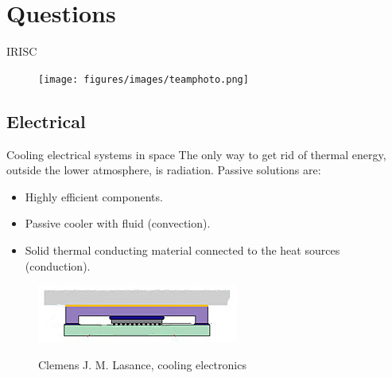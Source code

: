 \documentclass[11pt, aspectratio=169]{beamer}
\begin{document}
\section{Questions}
\begin{frame}{IRISC}
    \label{slide:questions}
    \centering
    \vspace{-0.71cm}
    \begin{figure}
    \hspace*{-1.1cm}
    	\texttt{[image: figures/images/teamphoto.png]}
    \end{figure}
\end{frame}






\subsection{Electrical}
\begin{frame}[t]{Cooling electrical systems in space}
    The only way to get rid of thermal energy, outside the lower atmosphere, is radiation. Passive solutions are:
    \begin{itemize}
        \item Highly efficient components.
        \item Passive cooler with fluid (convection).
        \item Solid thermal conducting material connected to the heat sources (conduction).
    \end{itemize}
    
        \centering
        \vspace{1cm}
        \begin{figure}
            \includegraphics[width=.5\textwidth]{figures/images/Passive_cooler_2.jpg}\\
            \caption{Clemens J. M. Lasance, cooling electronics}
        \end{figure}
\end{frame}
\end{document}
